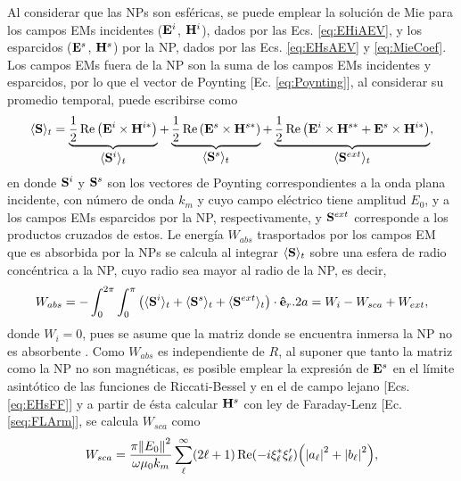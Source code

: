 Al considerar que las NPs son esféricas, se puede emplear la solución de Mie para los campos EMs incidentes ($\vb{E}^i$, $\vb{H}^i$), dados por las Ecs. \eqref{eq:EHiAEV}, y los esparcidos ($\vb{E}^s$, $\vb{H}^s$) por la NP,  dados por las Ecs. \eqref{eq:EHsAEV} y \eqref{eq:MieCoef}. Los campos EMs fuera de la NP son la suma de los campos EMs incidentes y esparcidos, por lo que el vector de Poynting [Ec. \eqref{eq:Poynting}], al considerar su promedio temporal, puede escribirse como \cite{bohren1998absorption}
%
\begin{align*}
\langle\vb{S}\rangle_t 
		= \underbrace{\frac12 \Re \qty(\vb{E}^i\times\vb{H}^{i*})}_{\text{\normalsize $\langle\vb{S}^i\rangle_t $}} + 
		\underbrace{\frac12 \Re \qty(\vb{E}^s\times\vb{H}^{s*})}_{\text{\normalsize $\langle\vb{S}^s\rangle_t $}}+
		\underbrace{	\frac12 \Re\qty(\vb{E}^i\times\vb{H}^{s*} + \vb{E}^s\times\vb{H}^{i*})}_{\text{\normalsize$\langle\vb{S}^{ext}\rangle_t $}},
\end{align*}
%
en donde $\vb{S}^i$ y $\vb{S}^s$ son los vectores de Poynting correspondientes a la onda plana incidente, con número de onda $k_m$ y cuyo campo eléctrico tiene amplitud $E_0$, y a los campos EMs esparcidos por la NP, respectivamente, y $\vb{S}^{ext}$ corresponde a los productos cruzados de estos. Le energía $W_{abs}$ trasportados por los campos EM que es absorbida por la NPs se calcula al integrar $\langle\vb{S}\rangle_t$ sobre una esfera de radio concéntrica a la NP, cuyo radio sea mayor al radio de la NP, es decir,
%
\begin{equation}
W_{abs} = - \int_0^{2\pi}\int_0^{\pi}
		\qty(\langle\vb{S}^i\rangle_t +\langle\vb{S}^s\rangle_t 
				+\langle\vb{S}^{ext}\rangle_t )
		\cdot \vu{e}_r .2 a
		 = W_i-W_{sca}+W_{ext},
		 \label{eq:WaAll}
\end{equation}
%
donde $W_i = 0$, pues se asume que la matriz donde se encuentra inmersa la NP no es absorbente \cite{bohren1998absorption}. Como $W_{abs}$ es independiente de $R$, al suponer que tanto la matriz como la NP no son magnéticas, es posible emplear la expresión de $\vb{E}^s$ en el límite asintótico de las funciones de Riccati-Bessel y en el de campo lejano [Ecs. \eqref{eq:EHsFF}] y a partir de ésta calcular $\vb{H}^s$ con ley de Faraday-Lenz [Ec. \eqref{seq:FLArm}], se calcula $W_{sca}$ como \cite{bohren1998absorption}
 	\begin{equation}
W_{sca} = \frac{\pi\norm{E_0}^2}{\omega\mu_0 k_m}
		\sum_\ell^\infty (2\ell+1)\Re(-i\xi_\ell^*\xi_\ell')\qty(\abs{a_\ell}^2+\abs{b_\ell}^2),
	\label{eq:WsAll}
	\end{equation}
